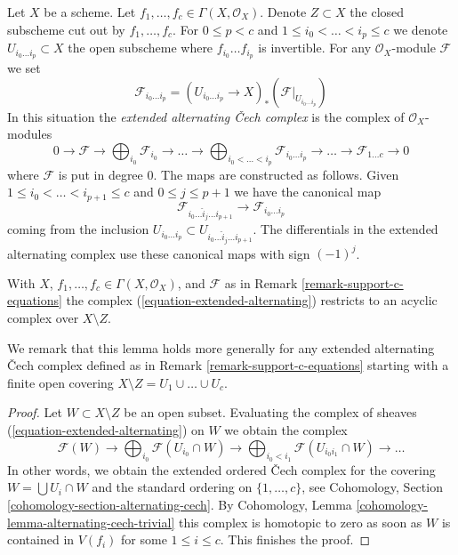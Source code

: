 \begin{remark}
\label{remark-support-c-equations}
Let $X$ be a scheme. Let $f_1, \ldots, f_c \in \Gamma(X, \mathcal{O}_X)$.
Denote $Z \subset X$ the closed subscheme cut out by $f_1, \ldots, f_c$.
For $0 \leq p < c$ and $1 \leq i_0 < \ldots < i_p \leq c$ we denote
$U_{i_0 \ldots i_p} \subset X$ the open subscheme where
$f_{i_0} \ldots f_{i_p}$ is invertible. For any $\mathcal{O}_X$-module
$\mathcal{F}$ we set
$$
\mathcal{F}_{i_0 \ldots i_p} =
(U_{i_0 \ldots i_p} \to X)_*(\mathcal{F}|_{U_{i_0 \ldots i_p}})
$$
In this situation the {\it extended alternating {\v C}ech complex}
is the complex of $\mathcal{O}_X$-modules
\begin{equation}
\label{equation-extended-alternating}
0 \to \mathcal{F} \to
\bigoplus\nolimits_{i_0} \mathcal{F}_{i_0} \to
\ldots \to
\bigoplus\nolimits_{i_0 < \ldots < i_p} \mathcal{F}_{i_0 \ldots i_p} \to
\ldots \to \mathcal{F}_{1 \ldots c} \to 0
\end{equation}
where $\mathcal{F}$ is put in degree $0$. The maps are constructed as
follows. Given
$1 \leq i_0 < \ldots < i_{p + 1} \leq c$ and $0 \leq j \leq p + 1$ we
have the canonical map
$$
\mathcal{F}_{i_0 \ldots \hat i_j \ldots i_{p + 1}} \to
\mathcal{F}_{i_0 \ldots i_p}
$$
coming from the inclusion
$U_{i_0 \ldots i_p} \subset U_{i_0 \ldots \hat i_j \ldots i_{p + 1}}$.
The differentials in the extended alternating complex use these
canonical maps with sign $(-1)^j$.
\end{remark}

\begin{lemma}
\label{lemma-extended-alternating-zero}
With $X$, $f_1, \ldots, f_c \in \Gamma(X, \mathcal{O}_X)$, and
$\mathcal{F}$ as in Remark \ref{remark-support-c-equations}
the complex (\ref{equation-extended-alternating}) restricts to an acyclic
complex over $X \setminus Z$.
\end{lemma}

\noindent
We remark that this lemma holds more generally for any
extended alternating {\v C}ech complex defined as in
Remark \ref{remark-support-c-equations} starting with a finite
open covering $X \setminus Z = U_1 \cup \ldots \cup U_c$.

\begin{proof}
Let $W \subset X \setminus Z$ be an open subset. Evaluating the complex
of sheaves (\ref{equation-extended-alternating}) on $W$ we obtain the
complex
$$
\mathcal{F}(W) \to \bigoplus\nolimits_{i_0} \mathcal{F}(U_{i_0} \cap W) \to
\bigoplus\nolimits_{i_0 < i_1} \mathcal{F}(U_{i_0i_1} \cap W) \to \ldots
$$
In other words, we obtain the extended ordered {\v C}ech complex
for the covering $W = \bigcup U_i \cap W$ and the standard
ordering on $\{1, \ldots, c\}$, see
Cohomology, Section \ref{cohomology-section-alternating-cech}.
By Cohomology, Lemma \ref{cohomology-lemma-alternating-cech-trivial}
this complex is homotopic to zero as soon as $W$ is contained in
$V(f_i)$ for some $1 \leq i \leq c$. This finishes the proof.
\end{proof}

